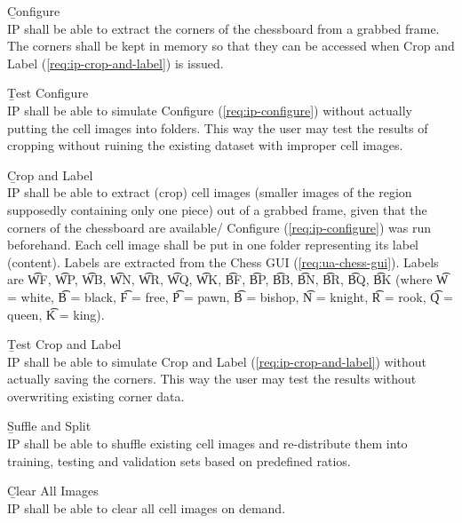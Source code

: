 \begin{enumeratenum}
\begin{enumeratenum}
            \item \b{Configure} \label{req:ip-configure}\\
            IP shall be able to extract the corners of the chessboard from a grabbed frame. The corners shall be kept in memory so that they can be accessed when Crop and Label (\ref{req:ip-crop-and-label}) is issued.

            \item \b{Test Configure} \label{req:ip-test-configure}\\
            IP shall be able to simulate Configure (\ref{req:ip-configure}) without actually putting the cell images into folders. This way the user may test the results of cropping without ruining the existing dataset with improper cell images.

            \item \b{Crop and Label} \label{req:ip-crop-and-label}\\
            IP shall be able to extract (crop) cell images (smaller images of the region supposedly containing only one piece) out of a grabbed frame, given that the corners of the chessboard are available/ Configure (\ref{req:ip-configure}) was run beforehand. Each cell image shall be put in one folder representing its label (content). Labels are extracted from the Chess GUI (\ref{req:ua-chess-gui}). Labels are \t{WF}, \t{WP}, \t{WB}, \t{WN}, \t{WR}, \t{WQ}, \t{WK}, \t{BF}, \t{BP}, \t{BB}, \t{BN}, \t{BR}, \t{BQ}, \t{BK} (where \t{W} = white, \t{B} = black, \t{F} = free, \t{P} = pawn, \t{B} = bishop, \t{N} = knight, \t{R} = rook, \t{Q} = queen, \t{K} = king).

            \item \b{Test Crop and Label} \label{req:ip-test-crop-and-label}\\
            IP shall be able to simulate Crop and Label (\ref{req:ip-crop-and-label}) without actually saving the corners. This way the user may test the results without overwriting existing corner data.

            \item \b{Suffle and Split} \label{req:ip-shuffle-and-split}\\
            IP shall be able to shuffle existing cell images and re-distribute them into training, testing and validation sets based on predefined ratios.

            \item \b{Clear All Images} \label{req:ip-clear-all-images}\\
            IP shall be able to clear all cell images on demand.  


\end{enumeratenum}
\end{enumeratenum}
